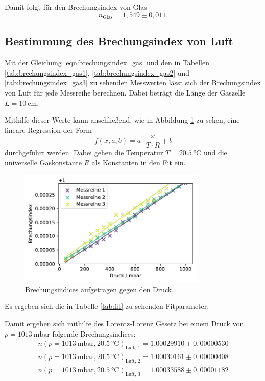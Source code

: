 Damit folgt für den Brechungsindex von Glas
\begin{equation}
    n_\text{Glas} = 1,549 \pm 0,011 .
\end{equation}

\subsection{Bestimmung des Brechungsindex von Luft}
Mit der Gleichung \ref{eqn:brechungsindex_gas} und den in Tabellen \ref{tab:brechungsindex_gas1}, \ref{tab:brechungsindex_gas2} und \ref{tab:brechungsindex_gas3} zu sehenden Messwerten lässt sich der Brechungsindex von Luft für jede Messreihe berechnen. Dabei beträgt die Länge der Gaszelle $L = \SI{10}{\centi \meter}$.



Mithilfe dieser Werte kann anschließend, wie in Abbildung \ref{fig:n} zu sehen,  eine lineare Regression der Form 
\begin{equation}
    f(x, a, b) = a \cdot \frac{x}{T \cdot R} + b
    \label{eqn:fit}
\end{equation}
durchgeführt werden. Dabei gehen die Temperatur $T = \SI{20,5}{\celsius} $ und die universelle Gaskonstante $R$ als Konstanten in den Fit ein. 
\begin{figure}[H]
    \centering
    \includegraphics[width=0.8\textwidth]{data/Plots/Brechungsindex.pdf}
    \caption{Brechungsindices aufgetragen gegen den Druck. }
    \label{fig:n}
\end{figure}
Es ergeben sich die in Tabelle \ref{tab:fit} zu sehenden Fitparameter.

Damit ergeben sich mithilfe des Lorentz-Lorenz Gesetz bei einem Druck von $p = \SI{1013}{\milli \bar}$ folgende Brechungsindices:
\begin{align}                                 
    n(p = \SI{1013}{\milli \bar}, \SI{20,5}{\celsius} )_\text{Luft, 1} = 1.00029910 \pm 0,00000530   \\
    n(p = \SI{1013}{\milli \bar}, \SI{20,5}{\celsius} )_\text{Luft, 2} = 1.00030161 \pm 0,00000408   \\
    n(p = \SI{1013}{\milli \bar}, \SI{20,5}{\celsius} )_\text{Luft, 3} = 1.00033588 \pm 0,00001182  
\end{align}
